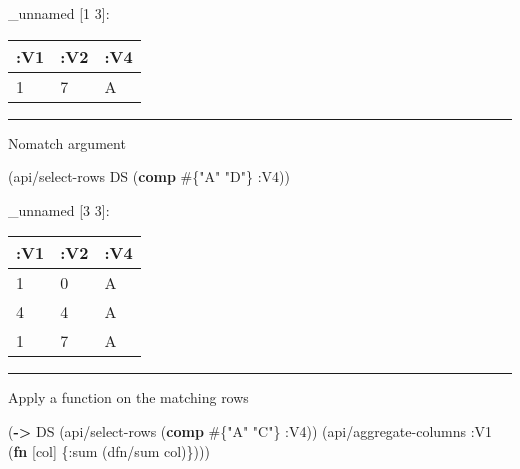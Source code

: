 \documentclass[]{article}
\newenvironment{Shaded}{\begin{snugshade}}{\end{snugshade}}
\newcommand{\AttributeTok}[1]{\textcolor[rgb]{0.77,0.63,0.00}{#1}}
\newcommand{\KeywordTok}[1]{\textcolor[rgb]{0.13,0.29,0.53}{\textbf{#1}}}
\newcommand{\NormalTok}[1]{#1}
\newcommand{\StringTok}[1]{\textcolor[rgb]{0.31,0.60,0.02}{#1}}
\newcommand{\VariableTok}[1]{\textcolor[rgb]{0.00,0.00,0.00}{#1}}
\begin{document}
\begin{Shaded}
\end{Shaded}

\_unnamed {[}1 3{]}:

\begin{longtable}[]{@{}lll@{}}
\toprule
:V1 & :V2 & :V4\tabularnewline
\midrule
\endhead
1 & 7 & A\tabularnewline
\bottomrule
\end{longtable}

\begin{center}\rule{0.5\linewidth}{0.5pt}\end{center}

Nomatch argument

\begin{Shaded}
\begin{Highlighting}[]
\NormalTok{(api/select-rows DS (}\KeywordTok{comp}\NormalTok{ #\{}\StringTok{"A"} \StringTok{"D"}\NormalTok{\} }\AttributeTok{:V4}\NormalTok{))}
\end{Highlighting}
\end{Shaded}

\_unnamed {[}3 3{]}:

\begin{longtable}[]{@{}lll@{}}
\toprule
:V1 & :V2 & :V4\tabularnewline
\midrule
\endhead
1 & 0 & A\tabularnewline
4 & 4 & A\tabularnewline
1 & 7 & A\tabularnewline
\bottomrule
\end{longtable}

\begin{center}\rule{0.5\linewidth}{0.5pt}\end{center}

Apply a function on the matching rows

\begin{Shaded}
\begin{Highlighting}[]
\NormalTok{(}\KeywordTok{->}\NormalTok{ DS}
\NormalTok{    (api/select-rows (}\KeywordTok{comp}\NormalTok{ #\{}\StringTok{"A"} \StringTok{"C"}\NormalTok{\} }\AttributeTok{:V4}\NormalTok{))}
\NormalTok{    (api/aggregate-columns }\AttributeTok{:V1}\NormalTok{ (}\KeywordTok{fn}\NormalTok{ [col]}
\NormalTok{                                 \{}\AttributeTok{:sum}\NormalTok{ (dfn/sum col)\})))}
\end{Highlighting}
\end{Shaded}
\end{document}
